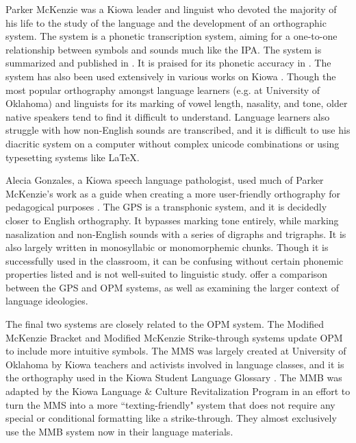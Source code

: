 \documentclass[output=paper]{langscibook}
\begin{document}
Parker McKenzie was a Kiowa leader and linguist who devoted the majority of his life to the study of the language and the development of an orthographic system. The system is a phonetic transcription system, aiming for a one-to-one relationship between symbols and sounds much like the IPA. The system is summarized and published in \citet{mckenzie:2001}. It is praised for its phonetic accuracy in \citet{watkins:2010}. The system has also been used extensively in various works on Kiowa \citep[e.g.]{palmer:2003,meadows:2010,mckenzie:2010,McKenzie:2012,mckenzie:2015,sutton:2014}. Though the most popular orthography amongst language learners (e.g. at University of Oklahoma) and linguists for its marking of vowel length, nasality, and tone, older native speakers tend to find it difficult to understand. Language learners also struggle with how non-English sounds are transcribed, and it is difficult to use his diacritic system on a computer without complex unicode combinations or using typesetting systems like LaTeX.

Alecia Gonzales, a Kiowa speech language pathologist, used much of Parker McKenzie’s work as a guide when creating a more user-friendly orthography for pedagogical purposes \citep{gonzales:2001}. The GPS is a transphonic system, and it is decidedly closer to English orthography. It bypasses marking tone entirely, while marking nasalization and non-English sounds with a series of digraphs and trigraphs. It is also largely written in monosyllabic or monomorphemic chunks. Though it is successfully used in the classroom, it can be confusing without certain phonemic properties listed and is not well-suited to linguistic study. \citet{neely:2009} offer a comparison between the GPS and OPM systems, as well as examining the larger context of language ideologies. 

The final two systems are closely related to the OPM system. The Modified McKenzie Bracket and Modified McKenzie Strike-through systems update OPM to include more intuitive symbols. The MMS was largely created at University of Oklahoma by Kiowa teachers and activists involved in language classes, and it is the orthography used in the Kiowa Student Language Glossary \citep{poolaw:up}. The MMB was adapted by the Kiowa Language \& Culture Revitalization Program in an effort to turn the MMS into a more ``texting-friendly" system that does not require any special or conditional formatting like a strike-through. They almost exclusively use the MMB system now in their language materials. 
\end{document}
